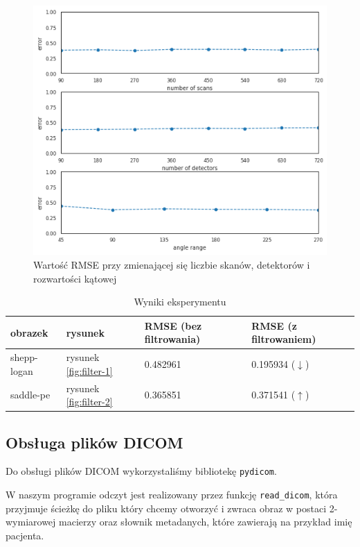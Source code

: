 \documentclass[11pt]{article}
\def\code#1{\texttt{#1}}
\begin{document}
\begin{figure}[h]
	\includegraphics[width=\linewidth]{res/rmse.png}
	\caption{Wartość RMSE przy zmienającej się liczbie skanów, detektorów i rozwartości kątowej}
	\label{fig:rmse}
\end{figure}

\begin{table}
    \centering
    \caption{Wyniki eksperymentu}
    \label{tab:filter}
    \begin{tabular}{llll}
    \toprule
    obrazek     & rysunek & RMSE (bez filtrowania) & RMSE (z filtrowaniem) \\
    \midrule
    shepp-logan & rysunek \ref{fig:filter-1} & 0.482961 & 0.195934 ($\downarrow$) \\
    saddle-pe   & rysunek \ref{fig:filter-2} & 0.365851 & 0.371541 ($\uparrow$) \\
    \bottomrule
    \end{tabular}
\end{table}

\newpage

\subsection{Obsługa plików DICOM}

Do obsługi plików DICOM wykorzystaliśmy bibliotekę \code{pydicom}.

W naszym programie odczyt jest realizowany przez funkcję \code{read\_dicom}, która przyjmuje ścieżkę do pliku który chcemy otworzyć i zwraca obraz w postaci 2-wymiarowej macierzy oraz słownik metadanych, które zawierają na przykład imię pacjenta.
\end{document}
